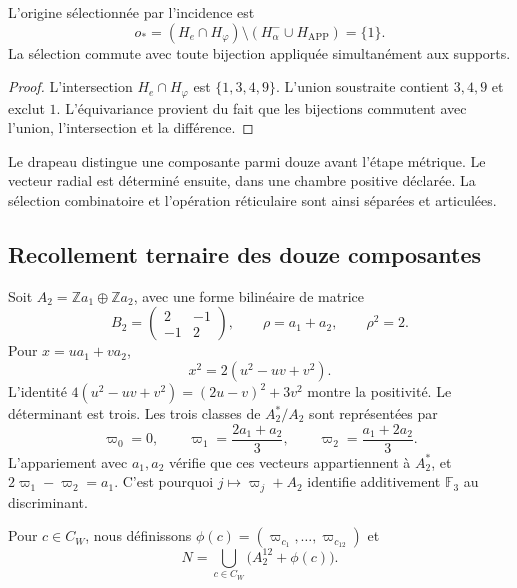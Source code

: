 \begin{lemma}
\label{lem:lf-origin}
L’origine sélectionnée par l’incidence est
\[
 o_*=(H_e\cap H_\varphi)
                 \setminus(H_\alpha^-\cup H_{\mathrm{APP}})
     =\{1\}.
\]
La sélection commute avec toute bijection appliquée simultanément aux supports.
\end{lemma}
\begin{proof}
L’intersection \(H_e\cap H_\varphi\) est
\(\{1,3,4,9\}\). L’union soustraite contient \(3,4,9\)
et exclut \(1\). L’équivariance provient du fait que les
bijections commutent avec l’union, l’intersection et la différence.
\end{proof}

Le drapeau distingue une composante parmi douze avant l'étape métrique. Le vecteur radial est déterminé ensuite, dans une chambre positive déclarée. La sélection combinatoire et l'opération réticulaire sont ainsi séparées et articulées.

\subsection{Recollement ternaire des douze composantes}
\label{subsec:lf-glue}

Soit \(A_2=\mathbb Za_1\oplus\mathbb Za_2\), avec une forme
bilinéaire de matrice
\[
 B_2=\begin{pmatrix}2&-1\\-1&2\end{pmatrix},
 \qquad \rho=a_1+a_2,\qquad \rho^2=2.
\]
Pour \(x=ua_1+va_2\),
\[
 x^2=2(u^2-uv+v^2).
\]
L’identité
\(4(u^2-uv+v^2)=(2u-v)^2+3v^2\) montre
la positivité. Le déterminant est trois. Les trois
classes de \(A_2^*/A_2\) sont représentées par
\[
 \varpi_0=0,\qquad
 \varpi_1=\frac{2a_1+a_2}{3},\qquad
 \varpi_2=\frac{a_1+2a_2}{3}.
\]
L’appariement avec \(a_1,a_2\) vérifie que ces
vecteurs appartiennent à \(A_2^*\), et
\(2\varpi_1-\varpi_2=a_1\). C’est pourquoi
\(j\mapsto\varpi_j+A_2\) identifie additivement
\(\mathbb F_3\) au discriminant.

Pour \(c\in C_W\), nous définissons
\(\phi(c)=(\varpi_{c_1},\ldots,\varpi_{c_{12}})\)
et
\begin{equation}
 N=\bigcup_{c\in C_W}\bigl(A_2^{12}+\phi(c)\bigr).
 \label{eq:lf-glue}
\end{equation}

